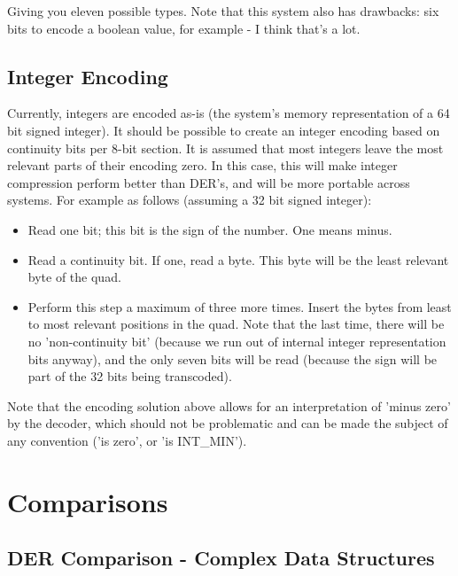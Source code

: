 Giving you eleven possible types.
Note that this system also has drawbacks:
six bits to encode a boolean value, for example - I think that's a lot.



\subsection{Integer Encoding}

Currently, integers are encoded as-is (the system's memory representation
of a 64 bit signed integer).
It should be possible to
create an integer encoding based on continuity bits per 8-bit section.
It is assumed
that most integers leave the most relevant parts of their encoding zero.
In this case, this will make integer compression perform better
than DER's, and will be more portable across systems.
For example as follows (assuming a 32 bit signed integer):

\begin{itemize}
\item Read one bit; this bit is the sign of the number. One means minus.
\item Read a continuity bit. If one, read a byte. This byte will be the
      least relevant byte of the quad.
\item Perform this step a maximum of three more times. Insert the bytes
      from least to most relevant positions in the quad. Note that the
      last time, there will be no 'non-continuity bit' (because we run
      out of internal integer representation bits anyway), and the
      only seven bits will be read (because the sign will be
      part of the 32 bits being transcoded).
\end{itemize}

Note that the encoding solution above allows for an interpretation of
'minus zero' by the decoder, which should not be problematic and can be
made the subject of any convention ('is zero', or 'is INT\_MIN').

%

\section{Comparisons}

\subsection{DER Comparison - Complex Data Structures}

